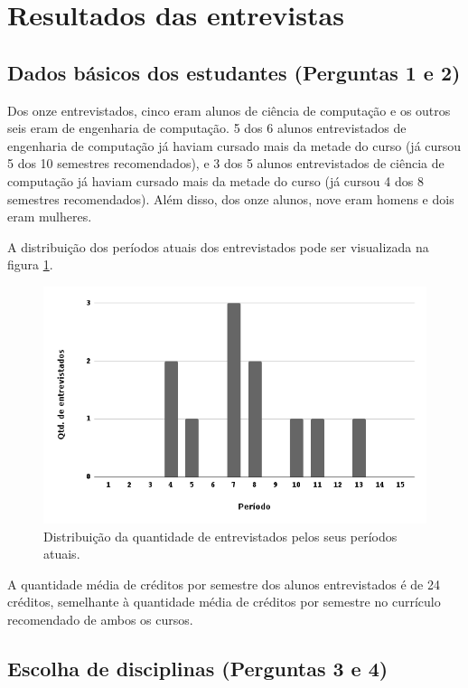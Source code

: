 \section{Resultados das entrevistas}

\subsection{Dados básicos dos estudantes (Perguntas 1 e 2)}

Dos onze entrevistados, cinco eram alunos de ciência de computação e os outros seis eram de engenharia de computação. 5 dos 6 alunos entrevistados de engenharia de computação já haviam cursado mais da metade do curso (já cursou 5 dos 10 semestres recomendados), e 3 dos 5 alunos entrevistados de ciência de computação já haviam cursado mais da metade do curso (já cursou 4 dos 8 semestres recomendados). Além disso, dos onze alunos, nove eram homens e dois eram mulheres.

A distribuição dos períodos atuais dos entrevistados pode ser visualizada na figura \ref{fig:entrevista-grafico}. 

\begin{figure}[!ht]
    \begin{center}
    \includegraphics[width=350pt]{figuras/grafico-entrevista}
    \caption{Distribuição da quantidade de entrevistados pelos seus períodos atuais.}
    \label{fig:entrevista-grafico}
    \end{center}
  \end{figure}
  

A quantidade média de créditos por semestre dos alunos entrevistados é de 24 créditos, semelhante à quantidade média de créditos por semestre no currículo recomendado de ambos os cursos.

\subsection{Escolha de disciplinas (Perguntas 3 e 4)}

